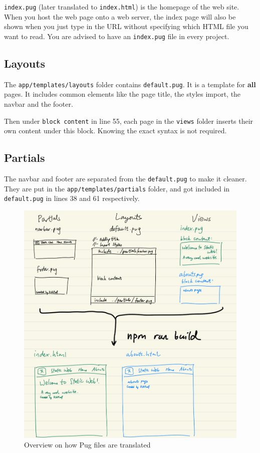 \texttt{index.pug} (later translated to \texttt{index.html}) is the homepage of the web site. When you host the web page onto a web server, the index page will also be shown when you just type in the URL without specifying which HTML file you want to read. You are advised to have an \texttt{index.pug} file in every project.

\subsection*{Layouts}

The \texttt{app/templates/layouts} folder contains \texttt{default.pug}. It is a template for \textbf{all} pages. It includes common elements like the page title, the styles import, the navbar and the footer. 

Then under \texttt{block content} in line 55, each page in the \texttt{views} folder inserts their own content under this block. Knowing the exact syntax is not required.

\subsection*{Partials}

The navbar and footer are separated from the \texttt{default.pug} to make it cleaner. They are put in the \texttt{app/templates/partials} folder, and got included in \texttt{default.pug} in lines 38 and 61 respectively.

\begin{figure}[h]
\centering
\includegraphics[width=13cm]{images/ch4-puglayouts.png}
\caption{Overview on how Pug files are translated}
\end{figure}

